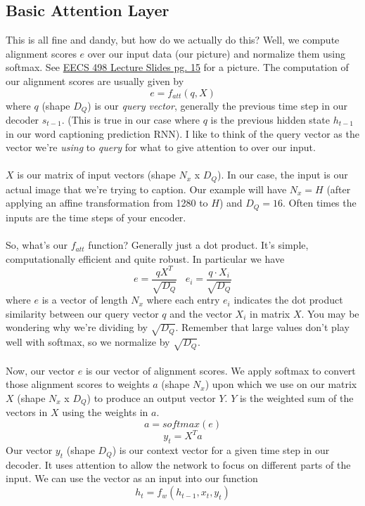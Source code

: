 \documentclass[12pt]{article}
\begin{document}
\subsection{Basic Attention Layer}
This is all fine and dandy, but how do we actually do this? Well, we compute 
alignment scores $e$ over our input data (our picture) and normalize them using 
softmax. See \href{https://web.eecs.umich.edu/~justincj/slides/eecs498/498_FA2019_lecture13.pdf}
{EECS 498 Lecture Slides pg. 15} for a picture. The computation of our alignment scores
are usually given by 
\begin{equation*}
    e = f_{att}(q, X)
\end{equation*}
where $q$ (shape $D_Q$) is our \emph{query vector}, generally the previous time step in our decoder
$s_{t-1}$. (This is true in our case where $q$ is the previous hidden state $h_{t-1}$ in our word 
captioning prediction RNN). I like to think of the query vector as the vector we're \emph{using} 
to \emph{query} for what to give attention to over our input. 
~\\
~\\
$X$ is our matrix of input vectors (shape $N_x$ x $D_Q$). In our case, the input is our 
actual image that we're trying to caption. Our example will have $N_x = H$ (after applying 
an affine transformation from 1280 to $H$) and 
$D_Q = 16$. Often times the inputs are the time steps of your encoder. 
~\\
~\\
So, what's our $f_{att}$ function? Generally just a dot product. It's simple, computationally
efficient and quite robust. In particular we have 
\begin{equation*}
    e = \frac{q X^T}{\sqrt{D_Q}} \; \; \; e_i = \frac{q \cdot X_i}{\sqrt{D_Q}}
\end{equation*}
where $e$ is a vector of length $N_x$ where each entry $e_i$ indicates the dot product similarity
between our query vector $q$ and the vector $X_i$ in matrix $X$. You may be wondering why we're dividing by $\sqrt{D_Q}$. 
Remember that large values don't play well with softmax, so we normalize by $\sqrt{D_Q}$. 
~\\
~\\
Now, our vector $e$ is our vector of alignment scores. We apply softmax to convert those 
alignment scores to weights $a$ (shape $N_x$) upon which we use on our matrix $X$ 
(shape $N_x$ x $D_Q$) to produce an output vector $Y$. $Y$ is the weighted sum of the 
vectors in $X$ using the weights in $a$. 
\begin{equation*}
    a = softmax(e)
\end{equation*}
\begin{equation*}
    y_t = X^Ta 
\end{equation*}
Our vector $y_t$ (shape $D_Q$) is our context vector for a given 
time step in our decoder. It uses attention to allow the network to focus on different 
parts of the input. We can use the vector as an input into our function 
\begin{equation*}
    h_t = f_w (h_{t-1}, x_t, y_t)
\end{equation*}
\end{document}
